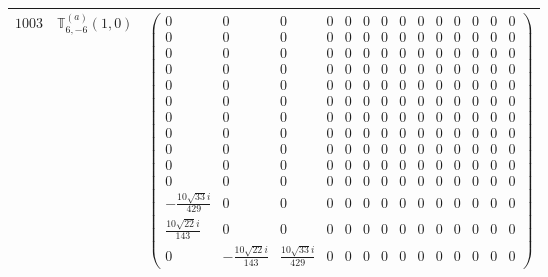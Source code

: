 \documentclass[fleqn,8pt,landscape]{jsarticle}
\begin{document}
\begin{center}
\begin{longtable}{ccc}
$ 1003 $ & $ \mathbb{T}_{6,-6}^{(a)}(1,0) $ & $ \begin{pmatrix} 0 & 0 & 0 & 0 & 0 & 0 & 0 & 0 & 0 & 0 & 0 & 0 & 0 & 0 \\ 0 & 0 & 0 & 0 & 0 & 0 & 0 & 0 & 0 & 0 & 0 & 0 & 0 & 0 \\ 0 & 0 & 0 & 0 & 0 & 0 & 0 & 0 & 0 & 0 & 0 & 0 & 0 & 0 \\ 0 & 0 & 0 & 0 & 0 & 0 & 0 & 0 & 0 & 0 & 0 & 0 & 0 & 0 \\ 0 & 0 & 0 & 0 & 0 & 0 & 0 & 0 & 0 & 0 & 0 & 0 & 0 & 0 \\ 0 & 0 & 0 & 0 & 0 & 0 & 0 & 0 & 0 & 0 & 0 & 0 & 0 & 0 \\ 0 & 0 & 0 & 0 & 0 & 0 & 0 & 0 & 0 & 0 & 0 & 0 & 0 & 0 \\ 0 & 0 & 0 & 0 & 0 & 0 & 0 & 0 & 0 & 0 & 0 & 0 & 0 & 0 \\ 0 & 0 & 0 & 0 & 0 & 0 & 0 & 0 & 0 & 0 & 0 & 0 & 0 & 0 \\ 0 & 0 & 0 & 0 & 0 & 0 & 0 & 0 & 0 & 0 & 0 & 0 & 0 & 0 \\ 0 & 0 & 0 & 0 & 0 & 0 & 0 & 0 & 0 & 0 & 0 & 0 & 0 & 0 \\ - \frac{10 \sqrt{33} i}{429} & 0 & 0 & 0 & 0 & 0 & 0 & 0 & 0 & 0 & 0 & 0 & 0 & 0 \\ \frac{10 \sqrt{22} i}{143} & 0 & 0 & 0 & 0 & 0 & 0 & 0 & 0 & 0 & 0 & 0 & 0 & 0 \\ 0 & - \frac{10 \sqrt{22} i}{143} & \frac{10 \sqrt{33} i}{429} & 0 & 0 & 0 & 0 & 0 & 0 & 0 & 0 & 0 & 0 & 0 \end{pmatrix} $ \\ \hline

\end{longtable}
\end{center}
\end{document}
